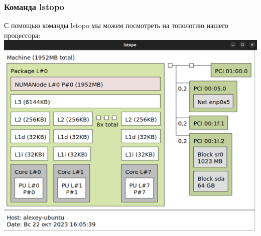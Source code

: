 \subsubsection{Команда lstopo}
С помощью команды lstopo мы можем посмотреть на топологию нашего процессора:\\
\includegraphics[width=\textwidth]{image/lstopo.png}
